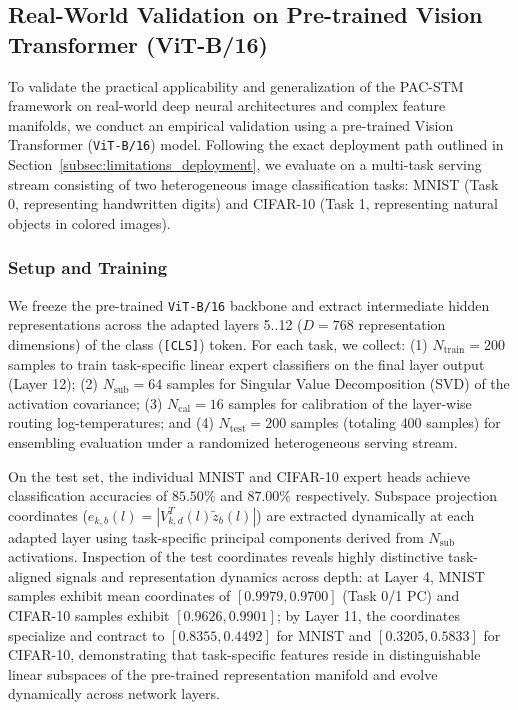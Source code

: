 \subsection{Real-World Validation on Pre-trained Vision Transformer (ViT-B/16)}
\label{subsec:real_world_vit}
To validate the practical applicability and generalization of the PAC-STM framework on real-world deep neural architectures and complex feature manifolds, we conduct an empirical validation using a pre-trained Vision Transformer (\texttt{ViT-B/16}) model. Following the exact deployment path outlined in Section~\ref{subsec:limitations_deployment}, we evaluate on a multi-task serving stream consisting of two heterogeneous image classification tasks: MNIST (Task 0, representing handwritten digits) and CIFAR-10 (Task 1, representing natural objects in colored images).

\subsubsection{Setup and Training}
We freeze the pre-trained \texttt{ViT-B/16} backbone and extract intermediate hidden representations across the adapted layers 5..12 ($D = 768$ representation dimensions) of the class (\texttt{[CLS]}) token. For each task, we collect: (1) $N_{\text{train}} = 200$ samples to train task-specific linear expert classifiers on the final layer output (Layer 12); (2) $N_{\text{sub}} = 64$ samples for Singular Value Decomposition (SVD) of the activation covariance; (3) $N_{\text{cal}} = 16$ samples for calibration of the layer-wise routing log-temperatures; and (4) $N_{\text{test}} = 200$ samples (totaling $400$ samples) for ensembling evaluation under a randomized heterogeneous serving stream.

On the test set, the individual MNIST and CIFAR-10 expert heads achieve classification accuracies of $85.50\%$ and $87.00\%$ respectively. Subspace projection coordinates ($e_{k, b}(l) = |V_{k, d}^T(l) \tilde{z}_b(l)|$) are extracted dynamically at each adapted layer using task-specific principal components derived from $N_{\text{sub}}$ activations. Inspection of the test coordinates reveals highly distinctive task-aligned signals and representation dynamics across depth: at Layer 4, MNIST samples exhibit mean coordinates of $[0.9979, 0.9700]$ (Task 0/1 PC) and CIFAR-10 samples exhibit $[0.9626, 0.9901]$; by Layer 11, the coordinates specialize and contract to $[0.8355, 0.4492]$ for MNIST and $[0.3205, 0.5833]$ for CIFAR-10, demonstrating that task-specific features reside in distinguishable linear subspaces of the pre-trained representation manifold and evolve dynamically across network layers.

